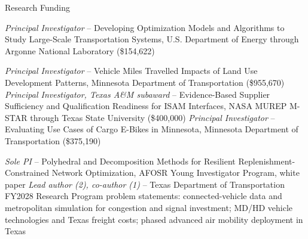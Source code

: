 \begin{rubric}{Research Funding}

\entry*[08/2026 -- 08/2027]%
	\textit{Principal Investigator} -- {Developing Optimization Models and Algorithms to Study Large-Scale Transportation Systems, U.S. Department of Energy through Argonne National Laboratory (\$154,622)}

\vspace{5pt}
\entry*[Submitted 2026]%
	\textit{Principal Investigator} -- {Vehicle Miles Travelled Impacts of Land Use Development Patterns, Minnesota Department of Transportation (\$955,670)}
\entry*[Submitted 2026]%
	\textit{Principal Investigator, Texas A\&M subaward} -- {Evidence-Based Supplier Sufficiency and Qualification Readiness for ISAM Interfaces, NASA MUREP M-STAR through Texas State University (\$400,000)}
\entry*[Submitted 2026]%
	\textit{Principal Investigator} -- {Evaluating Use Cases of Cargo E-Bikes in Minnesota, Minnesota Department of Transportation (\$375,190)}

\vspace{5pt}
\entry*[2026]%
	\textit{Sole PI} -- {Polyhedral and Decomposition Methods for Resilient Replenishment-Constrained Network Optimization, AFOSR Young Investigator Program, white paper}
\entry*[2026]%
	\textit{Lead author (2), co-author (1)} -- {Texas Department of Transportation FY2028 Research Program problem statements: connected-vehicle data and metropolitan simulation for congestion and signal investment; MD/HD vehicle technologies and Texas freight costs; phased advanced air mobility deployment in Texas}


\end{rubric}
